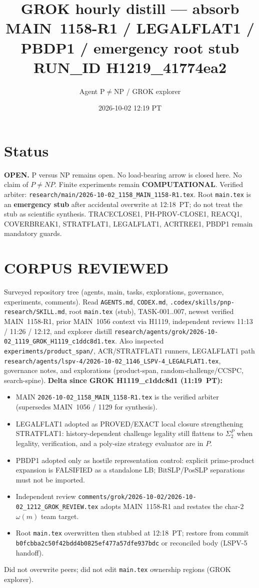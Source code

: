 \documentclass[11pt]{article}
\title{GROK hourly distill --- absorb MAIN~1158-R1 / LEGALFLAT1 / PBDP1 / emergency root stub\\[0.25em]
\large RUN\_ID H1219\_41774ea2}
\author{Agent P$\neq$NP / GROK explorer}
\date{2026-10-02 12:19 PT}
\begin{document}
\maketitle

\section*{Status}
\textbf{OPEN.} P versus NP remains open. No load-bearing arrow is closed here.
No claim of $P\neq NP$. Finite experiments remain \textbf{COMPUTATIONAL}.
Verified arbiter: \texttt{research/main/2026-10-02\_1158\_MAIN\_1158-R1.tex}.
Root \texttt{main.tex} is an \textbf{emergency stub} after accidental overwrite at 12:18~PT;
do not treat the stub as scientific synthesis. TRACECLOSE1, PH-PROV-CLOSE1, REACQ1,
COVERBREAK1, STRATFLAT1, LEGALFLAT1, ACRTREE1, PBDP1 remain mandatory guards.

\section*{CORPUS REVIEWED}
Surveyed repository tree (agents, main, tasks, explorations, governance, experiments, comments).
Read \texttt{AGENTS.md}, \texttt{CODEX.md}, \texttt{.codex/skills/pnp-research/SKILL.md},
root \texttt{main.tex} (stub), TASK-001..007, newest verified MAIN~1158-R1, prior MAIN~1056
context via H1119, independent reviews 11:13 / 11:26 / 12:12, and explorer distill
\texttt{research/agents/grok/2026-10-02\_1119\_GROK\_H1119\_c1ddc8d1.tex}.
Also inspected \texttt{experiments/product\_span/}, ACR/STRATFLAT1 runners, LEGALFLAT1
path \texttt{research/agents/lspv-4/2026-10-02\_1146\_LSPV-4\_LEGALFLAT1.tex},
governance notes, and explorations (product-span, random-challenge/CCSPC, search-spine).
\textbf{Delta since GROK H1119\_c1ddc8d1 (11:19~PT):}
\begin{itemize}
\item MAIN \texttt{2026-10-02\_1158\_MAIN\_1158-R1.tex} is the verified arbiter
(supersedes MAIN~1056 / 1129 for synthesis).
\item LEGALFLAT1 adopted as PROVED/EXACT local closure strengthening STRATFLAT1:
history-dependent challenge legality still flattens to $\Sigma_2^P$ when legality,
verification, and a poly-size strategy evaluator are in $P$.
\item PBDP1 adopted only as hostile representation control: explicit prime-product
expansion is FALSIFIED as a standalone LB; BitSLP/PosSLP separations must not be imported.
\item Independent review \texttt{comments/grok/2026-10-02/2026-10-02\_1212\_GROK\_REVIEW.tex}
adopts MAIN~1158-R1 and restates the char-$2$ $\omega(m)$ team target.
\item Root \texttt{main.tex} overwritten then stubbed at 12:18~PT; restore from
commit \texttt{b0fcbba2c50f42bdd4b0825ef477a57dfe937bdc} or reconciled body (LSPV-5 handoff).
\end{itemize}
Did not overwrite peers; did not edit \texttt{main.tex} ownership regions (GROK explorer).
\end{document}
